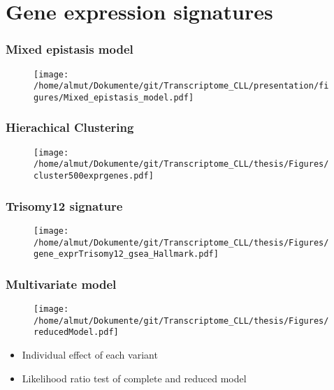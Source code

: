 \documentclass[xcolor=dvipsnames,t,10pt]{beamer}
\begin{document}
\section{Gene expression signatures}
%
%
\begin{frame}[c]
	\frametitle{Mixed epistasis model}
	\begin{figure}
		\centering
		\texttt{[image: /home/almut/Dokumente/git/Transcriptome\_CLL/presentation/figures/Mixed\_epistasis\_model.pdf]}
	\end{figure}
\end{frame}
%
%
\begin{frame}[c]
	\frametitle{Hierachical Clustering}
	\begin{figure}
		\centering
		\texttt{[image: /home/almut/Dokumente/git/Transcriptome\_CLL/thesis/Figures/cluster500exprgenes.pdf]}
	\end{figure}
\end{frame}
%
%
\begin{frame}[c]
	\frametitle{Trisomy12 signature}
	\begin{figure}
		\centering
		\texttt{[image: /home/almut/Dokumente/git/Transcriptome\_CLL/thesis/Figures/gene\_exprTrisomy12\_gsea\_Hallmark.pdf]}
	\end{figure}
\end{frame}
% 
\begin{frame}[c]
	\frametitle{Multivariate model}
	\begin{minipage}[t]{.67\textwidth}
		\begin{figure}
			\texttt{[image: /home/almut/Dokumente/git/Transcriptome\_CLL/thesis/Figures/reducedModel.pdf]}
		\end{figure}
	\end{minipage}
	\begin{minipage}[t]{.3\textwidth}
		\begin{itemize}
			\item Individual effect of each variant
			\item Likelihood ratio test of complete and reduced model
		\end{itemize}
	\end{minipage}
\end{frame}
% 
%
\end{document}
